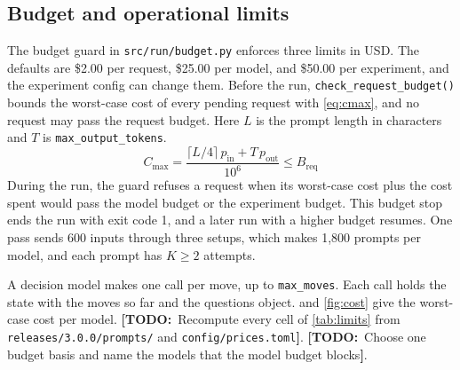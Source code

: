 \documentclass[10pt,twocolumn,letterpaper]{article}
\newcommand{\todo}[1]{{\color{red!70!black}\textbf{[TODO:}~#1\textbf{]}}}
\newcommand{\code}[1]{\texttt{#1}}
\begin{document}
\subsection{Budget and operational limits}\label{sec:budget}
The budget guard in \code{src/run/budget.py} enforces three limits in USD. The defaults are \$2.00 per request, \$25.00 per model, and \$50.00 per experiment, and the experiment config can change them. Before the run, \code{check\_request\_budget()} bounds the worst-case cost of every pending request with \cref{eq:cmax}, and no request may pass the request budget. Here $L$ is the prompt length in characters and $T$ is \code{max\_output\_tokens}.
\begin{equation}
C_{\max} = \frac{\lceil L/4 \rceil\, p_{\mathrm{in}} + T\, p_{\mathrm{out}}}{10^6} \le B_{\mathrm{req}}
\label{eq:cmax}
\end{equation}
During the run, the guard refuses a request when its worst-case cost plus the cost spent would pass the model budget or the experiment budget. This budget stop ends the run with exit code 1, and a later run with a higher budget resumes. One pass sends 600 inputs through three setups, which makes 1,800 prompts per model, and each prompt has $K \geq 2$ attempts.

A decision model makes one call per move, up to \code{max\_moves}. Each call holds the state with the moves so far and the questions object.  and \cref{fig:cost} give the worst-case cost per model. \todo{Recompute every cell of \cref{tab:limits} from \code{releases/3.0.0/prompts/} and \code{config/prices.toml}}. \todo{Choose one budget basis and name the models that the model budget blocks}.
\end{document}
